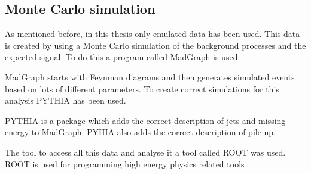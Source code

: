\subsection{Monte Carlo simulation}
As mentioned before, in this thesis only emulated data has been used. This data is created by using a Monte Carlo simulation of the background processes and the expected signal. To do this a program called MadGraph is used.

MadGraph \citep{madgraph} starts with Feynman diagrams and then generates simulated events based on lots of different parameters. To create correct simulations for this analysis PYTHIA has been used.

PYTHIA \citep{Sjostrand:2008} is a package which adds the correct description of jets and missing energy to MadGraph. PYHIA also adds the correct description of pile-up.

The tool to access all this data and analyse it a tool called ROOT was used. ROOT is used for programming high energy physics related tools \citep{root}